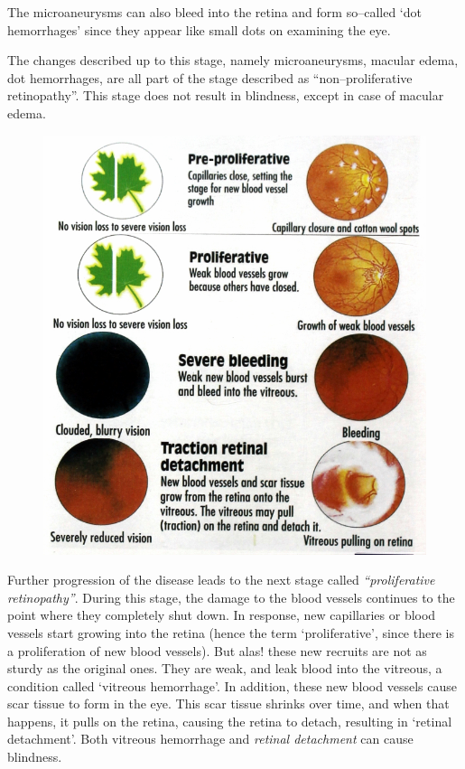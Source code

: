 {The microaneurysms can also bleed into the retina and form so–called ‘dot hemorrhages’ since they appear like small dots on examining the eye.

The changes described up to this stage, namely microaneurysms, macular edema, dot hemorrhages, are all part of the stage described as “non–proliferative retinopathy”. This stage does not result in blindness, except in case of macular edema.

\begin{figure}
\caption{}
\includegraphics{images/055.jpg}
\end{figure}

Further progression of the disease leads to the next stage called \textit{“proliferative retinopathy”}. During this stage, the damage to the blood vessels continues to the point where they completely shut down. In response, new capillaries or blood vessels start growing into the retina (hence the term ‘proliferative’, since there is a proliferation of new blood vessels). But alas! these new recruits are not as sturdy as the original ones. They are weak, and leak blood into the vitreous, a condition called ‘vitreous hemorrhage’. In addition, these new blood vessels cause scar tissue to form in the eye. This scar tissue shrinks over time, and when that happens, it pulls on the retina, causing the retina to detach, resulting in ‘retinal detachment’. Both vitreous hemorrhage and \textit{retinal detachment} can cause blindness.

}

